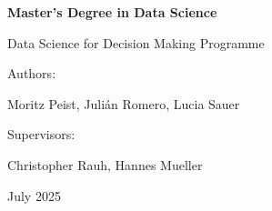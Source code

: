 \documentclass[12pt]{article}
\begin{document}
\begin{titlepage}
    \centering
    \par
    \vspace{1.5cm}

    {\LARGE\bfseries Master's Degree in Data Science\par}
    \vspace{0.3cm}
    {\LARGE Data Science for Decision Making Programme\par}

    \vfill

    {\huge\bfseries {}\par}

    \vfill

    {\Large Authors:\par}
    {\Large Moritz Peist, Julián Romero, Lucia Sauer\par}
    \vspace{0.5cm}
    {\Large Supervisors:\par}
    {\Large Christopher Rauh, Hannes Mueller\par}

    \vfill

    {\Large July 2025\par}
\end{titlepage}
\end{document}
